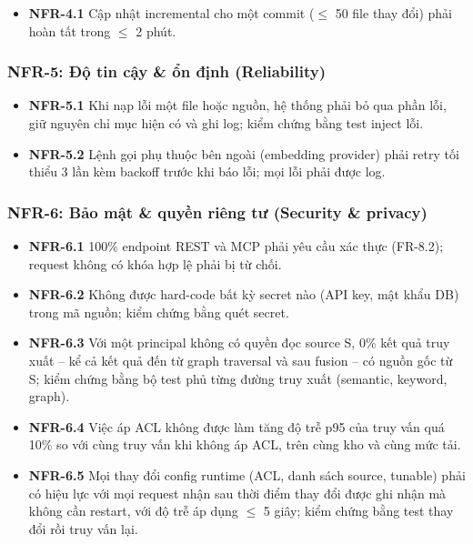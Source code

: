 \begin{itemize}
  \item \textbf{NFR-4.1} Cập nhật incremental cho một commit ($\leq$ 50 file thay đổi) phải hoàn tất trong $\leq$ 2 phút.
\end{itemize}

\subsubsection*{NFR-5: Độ tin cậy \& ổn định (Reliability)}

\begin{itemize}
  \item \textbf{NFR-5.1} Khi nạp lỗi một file hoặc nguồn, hệ thống phải bỏ qua phần lỗi, giữ nguyên chỉ mục hiện có và ghi log; kiểm chứng bằng test inject lỗi.
  \item \textbf{NFR-5.2} Lệnh gọi phụ thuộc bên ngoài (embedding provider) phải retry tối thiểu 3 lần kèm backoff trước khi báo lỗi; mọi lỗi phải được log.
\end{itemize}

\subsubsection*{NFR-6: Bảo mật \& quyền riêng tư (Security \& privacy)}

\begin{itemize}
  \item \textbf{NFR-6.1} 100\% endpoint REST và MCP phải yêu cầu xác thực (FR-8.2); request không có khóa hợp lệ phải bị từ chối.
  \item \textbf{NFR-6.2} Không được hard-code bất kỳ secret nào (API key, mật khẩu DB) trong mã nguồn; kiểm chứng bằng quét secret.
  \item \textbf{NFR-6.3} Với một principal không có quyền đọc source S, 0\% kết quả truy xuất -- kể cả kết quả đến từ graph traversal và sau fusion -- có nguồn gốc từ S; kiểm chứng bằng bộ test phủ từng đường truy xuất (semantic, keyword, graph).
  \item \textbf{NFR-6.4} Việc áp ACL không được làm tăng độ trễ p95 của truy vấn quá 10\% so với cùng truy vấn khi không áp ACL, trên cùng kho và cùng mức tải.
  \item \textbf{NFR-6.5} Mọi thay đổi config runtime (ACL, danh sách source, tunable) phải có hiệu lực với mọi request nhận sau thời điểm thay đổi được ghi nhận mà không cần restart, với độ trễ áp dụng $\leq$ 5 giây; kiểm chứng bằng test thay đổi rồi truy vấn lại.
\end{itemize}

